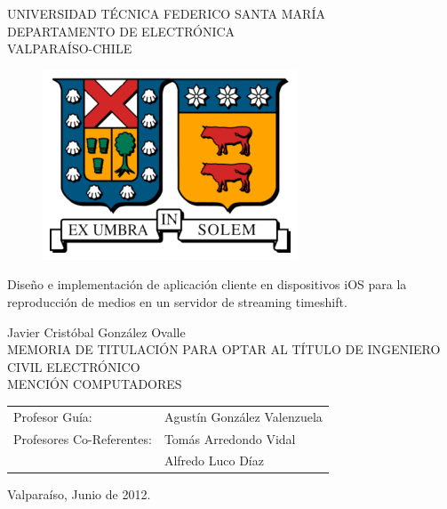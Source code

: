 \begin{titlepage}

\begin{center}

	\large  UNIVERSIDAD TÉCNICA FEDERICO SANTA MARÍA 	\\
 	\large \sc DEPARTAMENTO DE ELECTRÓNICA						\\
 	\large \sc VALPARAÍSO-CHILE												\\
\begin{figure}[h!]
	\centering
 	\includegraphics[scale=1]{imgs/logo_utfsm.eps} 
\end{figure}
\end{center}

\begin{center}
 \LARGE{Dise\~no e implementación de aplicaci\'on cliente en dispositivos iOS para la reproducci\'on de medios en un servidor de streaming timeshift.}
\end{center}

\begin{center}
 \normalsize Javier Crist\'obal Gonz\'alez Ovalle\\
 \normalsize MEMORIA DE TITULACIÓN PARA OPTAR AL TÍTULO DE
 \normalsize INGENIERO CIVIL ELECTRÓNICO			\\
 \normalsize MENCIÓN COMPUTADORES
\end{center}
\vspace*{1.5cm}

\begin{center}
\begin{tabular}{ll}
 \normalsize Profesor Guía: & Agustín González Valenzuela\\
 \normalsize Profesores Co-Referentes: &Tomás Arredondo Vidal\\
 															&Alfredo Luco Díaz
\end{tabular}
\end{center}
 
\vspace*{2cm}
\begin{center}
 \normalsize Valparaíso, Junio de 2012. \\
\end{center}
\end{titlepage}
